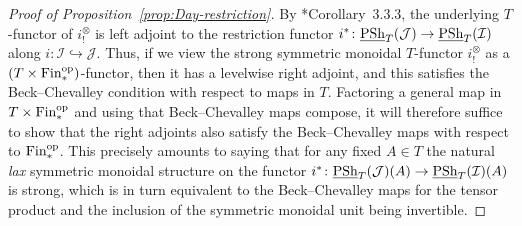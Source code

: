 \documentclass[reqno]{memo-l}
\theoremstyle{mythm}
\theoremstyle{definition}
\numberwithin{equation}{section}
\newcommand{\Ii}{{\mathcal{I}}}
\newcommand{\Jj}{{\mathcal J}}
\DeclareMathOperator{\PSh}{PSh}
\newcommand{\op}{{\textup{op}}}
\newcommand{\ulhelper}[2]{\underline{\setbox0=\hbox{$#1#2$}\dp0=0.4pt \box0\relax}}
\newcommand{\ul}[1]{{\mathpalette\ulhelper{#1}}\hbox{\rule[-2pt]{0pt}{0pt}}}
\begin{document}
\begin{proof}[Proof of Proposition~\ref{prop:Day-restriction}]
    By \cite{martiniwolf2021limits}*{Corollary~3.3.3}, the underlying $T$-functor of $i_!^\otimes$ is left adjoint to the restriction functor $i^*\colon\ul\PSh_T(\Jj)\to\ul\PSh_T(\Ii)$ along $i\colon\Ii\hookrightarrow\Jj$. Thus, if we view the strong symmetric monoidal $T$-functor $i_!^\otimes$ as a $(T\times\textup{Fin}_*^\op)$-functor, then it has a levelwise right adjoint, and this satisfies the Beck--Chevalley condition with respect to maps in $T$. Factoring a general map in $T\times\textup{Fin}_*^\op$ and using that Beck--Chevalley maps compose, it will therefore suffice to show that the right adjoints also satisfy the Beck--Chevalley maps with respect to $\textup{Fin}_*^\op$. This precisely amounts to saying that for any fixed $A\in T$ the natural \emph{lax} symmetric monoidal structure on the functor $i^*\colon\ul\PSh_{T}(\Jj)(A)\to\ul\PSh_{T}(\Ii)(A)$ is strong, which is in turn equivalent to the Beck--Chevalley maps for the tensor product and the inclusion of the symmetric monoidal unit being invertible.


\end{proof}
\end{document}
